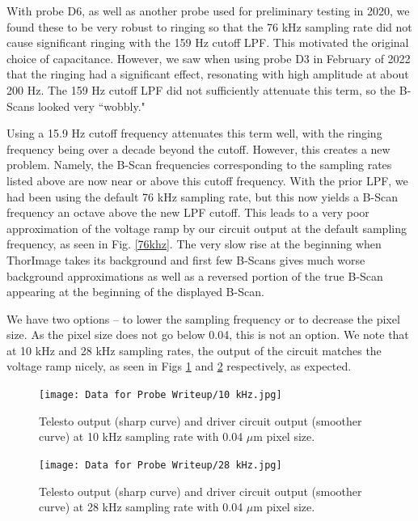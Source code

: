 \documentclass{article}
\begin{document}
\par{With probe D6, as well as another probe used for preliminary testing in 2020, we found these to be very robust to ringing so that the 76 kHz sampling rate did not cause significant ringing with the 159 Hz cutoff LPF. This motivated the original choice of capacitance. However, we saw when using probe D3 in February of 2022 that the ringing had a significant effect, resonating with high amplitude at about 200 Hz. The 159 Hz cutoff LPF did not sufficiently attenuate this term, so the B-Scans looked very ``wobbly."}
\par{Using a 15.9 Hz cutoff frequency attenuates this term well, with the ringing frequency being over a decade beyond the cutoff. However, this creates a new problem. Namely, the B-Scan frequencies corresponding to the sampling rates listed above are now near or above this cutoff frequency. With the prior LPF, we had been using the default 76 kHz sampling rate, but this now yields a B-Scan frequency an octave above the new LPF cutoff. This leads to a very poor approximation of the voltage ramp by our circuit output at the default sampling frequency, as seen in Fig. \ref{76khz}. The very slow rise at the beginning when ThorImage takes its background and first few B-Scans gives much worse background approximations as well as a reversed portion of the true B-Scan appearing at the beginning of the displayed B-Scan.}

\par{We have two options -- to lower the sampling frequency or to decrease the pixel size. As the pixel size does not go below 0.04, this is not an option. We note that at 10 kHz and 28 kHz sampling rates, the output of the circuit matches the voltage ramp nicely, as seen in Figs \ref{10khz} and \ref{28khz} respectively, as expected.}

\begin{figure}[!h]\label{10khz}
	\centering
	\texttt{[image: Data for Probe Writeup/10 kHz.jpg]}
	\caption{Telesto output (sharp curve) and driver circuit output (smoother curve) at 10 kHz sampling rate with 0.04 $\mu$m pixel size.}
\end{figure}

\begin{figure}[!h]\label{28khz}
	\centering
	\texttt{[image: Data for Probe Writeup/28 kHz.jpg]}
	\caption{Telesto output (sharp curve) and driver circuit output (smoother curve) at 28 kHz sampling rate with 0.04 $\mu$m pixel size.}
\end{figure}
\end{document}
